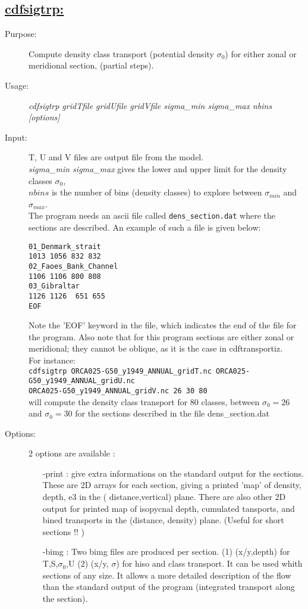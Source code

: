 \documentclass[a4paper,11pt]{article}
\begin{document}
\subsection*{\underline{cdfsigtrp:}}
\begin{description}
\item[Purpose:] Compute density class transport (potential density $\sigma_0$) for either zonal or meridional section, (partial steps).
\item[Usage:] {\em cdfsigtrp gridTfile gridUfile gridVfile  sigma\_min sigma\_max nbins [options] }
\item[Input:] T, U and V files are output file from the model.\\
   {\em sigma\_min sigma\_max } gives the lower and upper limit for the density classes $\sigma_0$,\\
   $nbins$ is the number of bins (density classes) to explore between  $\sigma_{min}$ and $\sigma_{max}$. \\
The program needs an ascii file called {\tt dens\_section.dat} where the sections are described. An example of such a file is given below:
\begin{scriptsize}
\begin{verbatim}
01_Denmark_strait
1013 1056 832 832
02_Faoes_Bank_Channel
1106 1106 800 808
03_Gibraltar
1126 1126  651 655
EOF
\end{verbatim}
\end{scriptsize}
Note the 'EOF' keyword in the file, which indicates the end of the file for the program. Also note that for this program sections are either 
zonal or meridional; they cannot be oblique, as it is the case in cdftransportiz.\\
For instance: \\
{\tt cdfsigtrp ORCA025-G50\_y1949\_ANNUAL\_gridT.nc ORCA025-G50\_y1949\_ANNUAL\_gridU.nc \ \\
ORCA025-G50\_y1949\_ANNUAL\_gridV.nc 26 30 80} \\
will compute the density class transport for 80 classes, between $\sigma_0=26$ and $\sigma_0=30$  for the sections described in the file dens\_section.dat
\item[Options:] 2 options are available :
   \begin{itemize}
	\item[-print] : give extra informations on the standard output for the sections.  These are 2D arrays for each section, giving
   a printed 'map' of density, depth, e3 in the ( distance,vertical) plane. There are also other 2D output for printed map of isopycnal
   depth, cumulated tansports, and bined transports in the (distance, density) plane. (Useful for short sections !! )
       \item[-bimg] : Two bimg files are produced per section. (1)  (x/y,depth) for T,S,$\sigma_0$,U (2) (x/y, $\sigma$) for   hiso and class transport.
        It can be used whith sections of any size. It allows a more detailed description of the flow than the standard output of the program
       (integrated transport along the section).
  \end{itemize}
              

\end{description}
\end{document}
